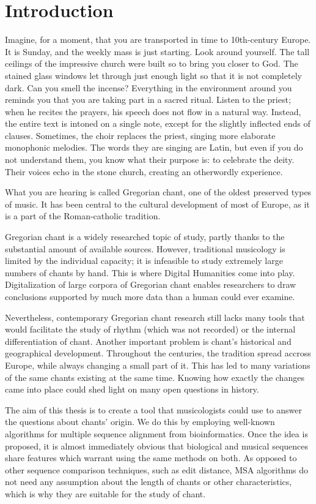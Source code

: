 \chapter*{Introduction}

Imagine, for a moment, that you are transported in time to 10th-century Europe. It is Sunday, and the weekly mass is just
starting. Look around yourself. The tall ceilings of the impressive church were built so to bring you closer to God. The stained glass windows
let through just enough light so that it is not completely dark. Can you smell the incense? Everything in the environment around
you reminds you that you are taking part in a sacred ritual. Listen to the priest; when he recites the prayers, his speech does not 
flow in a natural way. Instead, the entire text is intoned on a single note, except for the slightly inflected ends of clauses. 
Sometimes, the choir replaces the priest, singing more elaborate monophonic melodies. The words they are singing are Latin, but even 
if you do not understand them, you know what their purpose is: to celebrate the deity. Their voices echo in the stone church, creating an
otherwordly experience.

What you are hearing is called Gregorian chant, one of the oldest preserved types of music. It has been central to the cultural development
of most of Europe, as it is a part of the Roman-catholic tradition.

Gregorian chant is a widely researched topic of study, partly thanks to the substantial amount of available sources. However, traditional
musicology is limited by the individual capacity; it is infeasible to study extremely large numbers of chants by hand. This is where
Digital Humanities come into play. Digitalization of large corpora of Gregorian chant enables researchers to draw conclusions
supported by much more data than a human could ever examine.

Nevertheless, contemporary Gregorian chant research still lacks many tools that would facilitate the study of rhythm (which was not recorded)
or the internal differentiation of chant. Another important problem is chant's historical and geographical development. Throughout the 
centuries, the tradition spread accross Europe, while always changing a small part of it. This has led to many variations of the same
chants existing at the same time. Knowing how exactly the changes came into place could shed light on many open questions in history.

The aim of this thesis is to create a tool that musicologists could use to answer the questions about chants' origin. We do this by employing
well-known algorithms for multiple sequence alignment from bioinformatics. Once the idea is proposed, it is almost immediately obvious that
biological and musical sequences share features which warrant using the same methods on both. As opposed to other sequence comparison techniques, such as edit
distance, MSA algorithms do not need any assumption about the length of chants or other characteristics, which is why they are suitable
for the study of chant.

